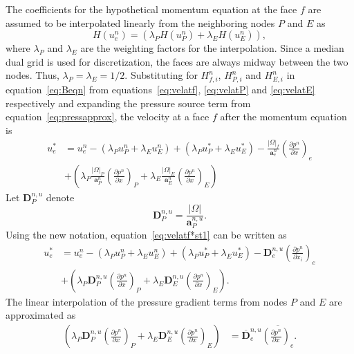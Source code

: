 \noindent
The coefficients for the hypothetical momentum equation at the face $f$ are assumed to  be interpolated linearly from the neighboring nodes $P$ and $E$ as
\begin{equation}
H(u^n_e)=(\lambda_P H(u^n_P)+\lambda_E H(u^n_E)),
\label{eq:Beqn}
\end{equation}{}
\noindent where $\lambda_P$ and $\lambda_E$ are the weighting factors for the interpolation. Since a median dual grid is used for discretization, the faces are always midway between the two nodes. Thus, $\lambda_P = \lambda_E = 1/2$. Substituting for $H_{f,i}^n$, $H_{P,i}^n$ and $H_{E,i}^n$ in equation~\ref{eq:Beqn} from equations~\ref{eq:velatf}, \ref{eq:velatP} and \ref{eq:velatE} respectively and expanding the pressure source term from equation~\ref{eq:pressapprox}, the velocity at a face $f$ after the momentum equation is
\begin{align}
u_{e}^{\ast} &= u_{e}^n - \left(\lambda_P u_{P}^n + \lambda_E u_{E}^n \right) +\left(\lambda_P u_{P}^{\ast} + \lambda_E u_{E}^{\ast}\right) - \frac{|\Omega|_{f}}{\mathbf{a}_{e}^n}\left(\frac{\partial p^n}{\partial x}\right)_e \nonumber \\&+ \left(\lambda_P\frac{|\Omega|_{P}}{\mathbf{a}_{P}^n}\left(\frac{\partial p^n}{\partial x}\right)_{P} + \lambda_E\frac{|\Omega|_{E}}{\mathbf{a}_{E}^n}\left(\frac{\partial p^n}{\partial x}\right)_{E}\right) 
\label{eq:velatf*st1}
\end{align}
Let $\boldsymbol{D}_{P}^{n,u}$ denote
\begin{equation}
\boldsymbol{D}_{P}^{n,u} = \frac{|\Omega|}{\mathbf{a}_{P}^{n,u}}.
\label{eq:Dfeqn}
\end{equation}
Using the new notation, equation~\ref{eq:velatf*st1} can be written as
\begin{align}
u_{e}^{\ast} &= u_{e}^n - \left(\lambda_P u_{P}^n + \lambda_E u_{E}^n\right) +\left(\lambda_P u_{P}^{\ast} + \lambda_E u_{E}^{\ast}\right) - \boldsymbol{D}_{e}^{n,u}\left(\frac{\partial p^n}{\partial x_i}\right)_e \nonumber \\&+ \left(\lambda_P\boldsymbol{D}_{P}^{n,u}\left(\frac{\partial p^n}{\partial x}\right)_{P} + \lambda_E\boldsymbol{D}_{E}^{n,u}\left(\frac{\partial p^n}{\partial x}\right)_{E}\right).
\label{eq:velatf*st2}
\end{align}
The linear interpolation of the pressure gradient terms from nodes $P$ and $E$ are approximated as
\begin{align}
 \left(\lambda_P\boldsymbol{D}_{P}^{n,u}\left(\frac{\partial p^n}{\partial x}\right)_P + \lambda_E\boldsymbol{D}_{E}^{n,u}\left(\frac{\partial p^n}{\partial x}\right)_E\right) &=\overline{\boldsymbol{D}}_{e}^{n,u}\overline{\left(\frac{\partial p^n}{\partial x}\right)_e}.  \label{eq:pbarassump}
\end{align}
